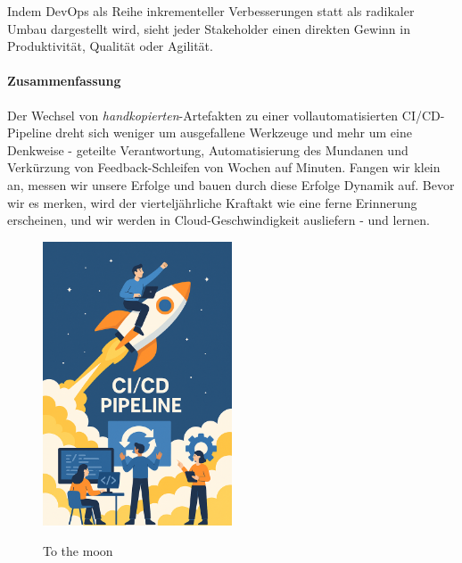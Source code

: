 Indem DevOps als Reihe inkrementeller Verbesserungen statt als radikaler Umbau dargestellt wird,
sieht jeder Stakeholder einen direkten Gewinn in Produktivität, Qualität oder Agilität. \\


\newpage

\paragraph{Zusammenfassung}

Der Wechsel von \textit{handkopierten}-Artefakten zu einer vollautomatisierten CI/CD-Pipeline dreht sich weniger um
ausgefallene Werkzeuge und mehr um eine Denkweise - geteilte Verantwortung, Automatisierung des Mundanen und Verkürzung von
Feedback-Schleifen von Wochen auf Minuten. Fangen wir klein an, messen wir unsere Erfolge und bauen durch diese Erfolge Dynamik auf.
Bevor wir es merken, wird der vierteljährliche Kraftakt wie eine ferne Erinnerung erscheinen, und wir werden in Cloud-Geschwindigkeit ausliefern -
und lernen.

\begin{figure}[h!]
    \centering
    \caption{To the moon}
        \includegraphics[width=0.5\textwidth]{fig/tothemoon.png}
        \label{fig:ASD-diagram}
    \end{figure}